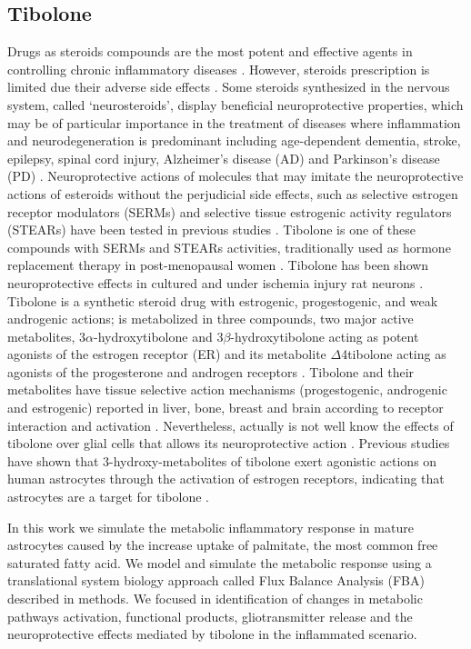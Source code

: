 \subsection*{Tibolone}
Drugs as steroids compounds are the most potent and effective agents in controlling chronic inflammatory diseases \cite{Laveti2013}. However, steroids prescription is limited due their adverse side effects \cite{Albertazzi1998}. Some steroids synthesized in the nervous system, called ‘neurosteroids’, display beneficial neuroprotective properties, which may be of particular importance in the treatment of diseases where inflammation and neurodegeneration is predominant including age-dependent dementia, stroke, epilepsy, spinal cord injury, Alzheimer’s disease (AD) and Parkinson’s disease (PD) \cite{Wojtal2006}. Neuroprotective actions of molecules that may imitate the neuroprotective actions of esteroids without the perjudicial side effects, such as selective estrogen receptor modulators (SERMs) and selective tissue estrogenic activity regulators (STEARs) have been tested in previous studies \cite{Kloosterboer2001,Sharma2006}. Tibolone is one of these compounds with SERMs and STEARs activities, traditionally used as hormone replacement therapy in post-menopausal women \cite{Timmer2002}. Tibolone has been shown neuroprotective effects in cultured and under ischemia injury rat neurons \cite{Altinoz2009}. Tibolone is a synthetic steroid drug with estrogenic, progestogenic, and weak androgenic actions; is metabolized in three compounds, two major active metabolites, 3$\alpha$-hydroxytibolone and 3$\beta$-hydroxytibolone acting as potent agonists of the estrogen receptor (ER) and its metabolite $\Delta$4tibolone acting as agonists of the progesterone and androgen receptors \cite{Kloosterboer2004}. Tibolone and their metabolites have tissue selective action mechanisms (progestogenic, androgenic and estrogenic) reported in liver, bone, breast and brain according to receptor interaction and activation \cite{Kloosterboer2001}. Nevertheless, actually is not well know the effects of tibolone over glial cells that allows its neuroprotective action \cite{Avila-Rodriguez2014}. Previous studies have shown that 3-hydroxy-metabolites of tibolone exert agonistic actions on human astrocytes through the activation of estrogen receptors, indicating that astrocytes are a target for tibolone \cite{Altinoz2009}.

In this work we simulate the metabolic inflammatory response in mature astrocytes caused by the increase uptake of palmitate, the most common free saturated fatty acid. We model and simulate the metabolic response using a translational system biology approach called Flux Balance Analysis (FBA) described in methods. We focused in identification of changes in metabolic pathways activation, functional products, gliotransmitter release and the neuroprotective effects mediated by tibolone in the inflammated scenario.
